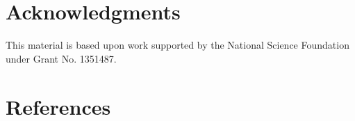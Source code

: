 \documentclass[final,3p,times,twocolumn,authoryear]{elsarticle}
\begin{document}
%
%

\section*{Acknowledgments}
This material is based upon work supported by the National Science Foundation under Grant No. 1351487.



\section*{References}
% 







\end{document}
